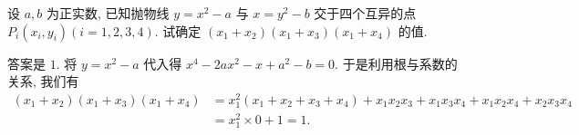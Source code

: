 \begin{prob}
\label{prob:prob-1}
设 $a, b$ 为正实数, 已知抛物线 $y = x^2 - a$ 与 $x = y^2 - b$
交于四个互异的点 $P_i(x_i,y_i) (i=1,2,3,4)$.
试确定 $(x_1 + x_2)(x_1 + x_3)(x_1 + x_4)$ 的值.
\end{prob}

\begin{soln}
答案是 $\boxed{1.}$ 将 $y = x^2 - a$ 代入得
$x^4 - 2ax^2 - x + a^2 - b = 0$.
于是利用根与系数的关系, 我们有
\begin{align*}
(x_1+x_2)(x_1+x_3)(x_1+x_4) &= x_1^2(x_1+x_2+x_3+x_4) + x_1x_2x_3 + x_1x_3x_4 + x_1x_2x_4 + x_2x_3x_4\\
							              &= x_1^2 \times 0 + 1 = 1.
\end{align*}
\end{soln}
